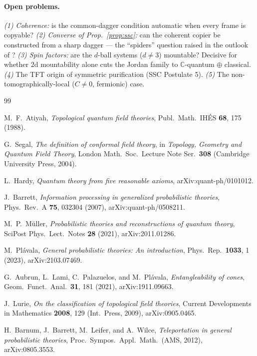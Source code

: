 \documentclass[prl,aps,10pt,superscriptaddress,floatfix]{revtex4-2}
\begin{document}
\paragraph{Open problems.}
\emph{(1) Coherence:} is the common-dagger condition automatic when every frame is copyable?
\emph{(2) Converse of Prop.~\ref{prop:ssc}:} can the coherent copier be constructed from a sharp dagger --- the ``spiders'' question raised in the outlook of \cite{SSC2021}?
\emph{(3) Spin factors:} are the $d$-ball systems ($d\neq3$) mountable? Decisive for whether $2$d mountability alone cuts the Jordan family to $\mathbb{C}$-quantum $\oplus$ classical.
\emph{(4)} The TFT origin of symmetric purification (SSC Postulate 5).
\emph{(5)} The non-tomographically-local ($C\neq0$, fermionic) case.

\begin{thebibliography}{99}

M.~F.~Atiyah,
\emph{Topological quantum field theories},
Publ.\ Math.\ IH\'ES \textbf{68}, 175 (1988).

G.~Segal,
\emph{The definition of conformal field theory},
in \emph{Topology, Geometry and Quantum Field Theory},
London Math.\ Soc.\ Lecture Note Ser.\ \textbf{308}
(Cambridge University Press, 2004).

L.~Hardy,
\emph{Quantum theory from five reasonable axioms},
arXiv:quant-ph/0101012.

J.~Barrett,
\emph{Information processing in generalized probabilistic theories},
Phys.\ Rev.\ A \textbf{75}, 032304 (2007),
arXiv:quant-ph/0508211.

M.~P.~M\"uller,
\emph{Probabilistic theories and reconstructions of quantum theory},
SciPost Phys.\ Lect.\ Notes \textbf{28} (2021),
arXiv:2011.01286.

M.~Pl\'avala,
\emph{General probabilistic theories: An introduction},
Phys.\ Rep.\ \textbf{1033}, 1 (2023),
arXiv:2103.07469.

G.~Aubrun, L.~Lami, C.~Palazuelos, and M.~Pl\'avala,
\emph{Entangleability of cones},
Geom.\ Funct.\ Anal.\ \textbf{31}, 181 (2021),
arXiv:1911.09663.

J.~Lurie,
\emph{On the classification of topological field theories},
Current Developments in Mathematics \textbf{2008}, 129 (Int.\ Press, 2009),
arXiv:0905.0465.

H.~Barnum, J.~Barrett, M.~Leifer, and A.~Wilce,
\emph{Teleportation in general probabilistic theories},
Proc.\ Sympos.\ Appl.\ Math.\ (AMS, 2012),
arXiv:0805.3553.


\end{thebibliography}
\end{document}
